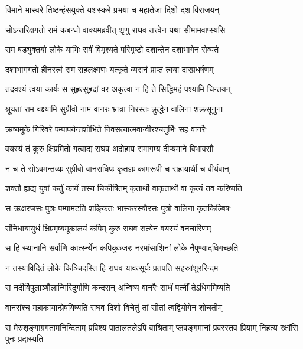 \twolineshloka
{विमाने भास्वरे तिष्ठन्हंसयुक्ते यशस्करे}
{प्रभया च महातेजा दिशो दश विराजयन्} %

\twolineshloka
{सोऽन्तरिक्षगतो रामं कबन्धो वाक्यमब्रवीत्}
{शृणु राघव तत्त्वेन यथा सीमामवाप्स्यसि} %

\twolineshloka
{राम षड्युक्तयो लोके याभिः सर्वं विमृश्यते}
{परिमृष्टो दशान्तेन दशाभागेन सेव्यते} %

\twolineshloka
{दशाभागगतो हीनस्त्वं राम सहलक्ष्मणः}
{यत्कृते व्यसनं प्राप्तं त्वया दारप्रधर्षणम्} %

\twolineshloka
{तदवश्यं त्वया कार्यः स सुहृत्सुहृदां वर}
{अकृत्वा न हि ते सिद्धिमहं पश्यामि चिन्तयन्} %

\twolineshloka
{श्रूयतां राम वक्ष्यामि सुग्रीवो नाम वानरः}
{भ्रात्रा निरस्तः क्रुद्धेन वालिना शक्रसूनुना} %

\twolineshloka
{ऋष्यमूके गिरिवरे पम्पापर्यन्तशोभिते}
{निवसत्यात्मवान्वीरश्चतुर्भिः सह वानरैः} %

\twolineshloka
{वयस्यं तं कुरु क्षिप्रमितो गत्वाद्य राघव}
{अद्रोहाय समागम्य दीप्यमाने विभावसौ} %

\twolineshloka
{न च ते सोऽवमन्तव्यः सुग्रीवो वानराधिपः}
{कृतज्ञः कामरूपी च सहायार्थी च वीर्यवान्} %

\twolineshloka
{शक्तौ ह्यद्य युवां कर्तुं कार्यं तस्य चिकीर्षितम्}
{कृतार्थो वाकृतार्थो वा कृत्यं तव करिष्यति} %

\twolineshloka
{स ऋक्षरजसः पुत्रः पम्पामटति शङ्कितः}
{भास्करस्यौरसः पुत्रो वालिना कृतकिल्बिषः} %

\twolineshloka
{संनिधायायुधं क्षिप्रमृष्यमूकालयं कपिम्}
{कुरु राघव सत्येन वयस्यं वनचारिणम्} %

\twolineshloka
{स हि स्थानानि सर्वाणि कार्त्स्न्येन कपिकुञ्जरः}
{नरमांसाशिनां लोके नैपुण्यादधिगच्छति} %

\twolineshloka
{न तस्याविदितं लोके किञ्चिदस्ति हि राघव}
{यावत्सूर्यः प्रतपति सहस्रांशुररिन्दम} %

\twolineshloka
{स नदीर्विपुलाञ्शैलान्गिरिदुर्गाणि कन्दरान्}
{अन्विष्य वानरैः सार्धं पत्नीं तेऽधिगमिष्यति} %

\twolineshloka
{वानरांश्च महाकायान्प्रेषयिष्यति राघव}
{दिशो विचेतुं तां सीतां त्वद्वियोगेन शोचतीम्} %

\fourlineindentedshloka
{स मेरुशृङ्गाग्रगतामनिन्दिताम्}
{प्रविश्य पातालतलेऽपि वाश्रिताम्}
{प्लवङ्गमानां प्रवरस्तव प्रियाम्}
{निहत्य रक्षांसि पुनः प्रदास्यति} %


